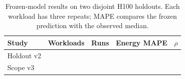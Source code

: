 \begin{table}[t]
\centering
\caption{Frozen-model results on two disjoint H100 holdouts.  Each workload
has three repeats; MAPE compares the frozen prediction with the observed
median.}
\label{tab:evidence-results}
\small
\setlength{\tabcolsep}{3.8pt}
\begin{tabular}{lrrrr}
\toprule
Study & Workloads & Runs & Energy MAPE & $\rho$ \\
\midrule
Holdout v2 & \HoldoutWorkloads{} & \HoldoutMeasurements{} &
\CalibratedEnergyMAPE{} & \EnergySpearman{} \\
Scope v3 & \ConfirmationWorkloads{} & \ConfirmationMeasurements{} &
\ConfirmationEnergyMAPE{} & \ConfirmationEnergySpearman{} \\
\bottomrule
\end{tabular}
\end{table}
